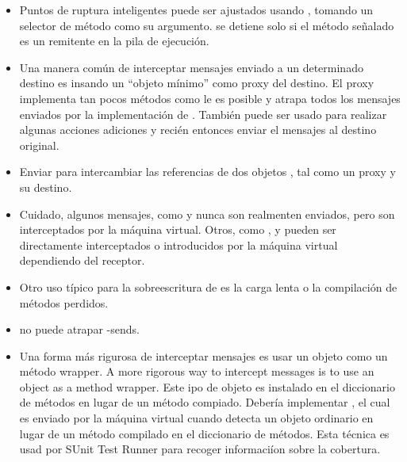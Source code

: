 \documentclass[a4paper,10pt,twoside]{book}
\begin{document}
\begin{itemize}
\item Puntos de ruptura inteligentes puede ser ajustados usando , tomando un selector de m\'etodo como su argumento.  se detiene solo si el m\'etodo se\~nalado es un remitente en la pila de ejecuci\'on.
\item Una manera com\'un de interceptar mensajes enviado a un determinado destino es insando un ``objeto m\'inimo'' como proxy del destino. El proxy implementa tan pocos m\'etodos como le es posible y atrapa todos los mensajes enviados por la implementaci\'on de . Tambi\'en puede ser usado para realizar algunas acciones adiciones y reci\'en entonces enviar el mensajes al destino original.
\item Enviar  para intercambiar las referencias de dos objetos , tal como un proxy y su destino.
\item Cuidado, algunos mensajes, como   y  nunca son realmenten enviados, pero son interceptados por la m\'aquina virtual. Otros, como \ct{+},  y \ct{-} pueden ser directamente interceptados o introducidos por la m\'aquina virtual dependiendo del receptor.
\item Otro uso t\'ipico para la sobreescritura de  es la carga  lenta o la compilaci\'on de m\'etodos perdidos.
\item {} no puede atrapar \self-sends.
\item Una forma m\'as rigurosa de interceptar mensajes es usar un objeto como un m\'etodo wrapper. 
A more rigorous way to intercept messages is to use an object as a method wrapper. Este ipo de objeto es instalado en el diccionario de m\'etodos en lugar de un m\'etodo compiado.  Deber\'ia implementar , el cual es enviado por la m\'aquina virtual cuando detecta un objeto ordinario en lugar de un m\'etodo compilado en el diccionario de m\'etodos. Esta t\'ecnica es usad por SUnit Test Runner para recoger informaci\'ion sobre la cobertura.
\end{itemize}

\ifx\wholebook\relax\else
   
   
\end{document}
